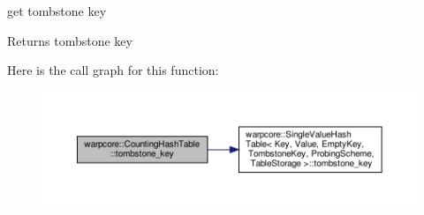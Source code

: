 get tombstone key 

\begin{DoxyReturn}{Returns}
tombstone key 
\end{DoxyReturn}
Here is the call graph for this function\+:
\nopagebreak
\begin{figure}[H]
\begin{center}
\leavevmode
\includegraphics[width=350pt]{classwarpcore_1_1CountingHashTable_a8b7932f1bb07c36dbcdfc383eb89548e_cgraph}
\end{center}
\end{figure}

